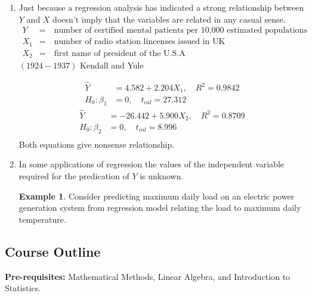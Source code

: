 \documentclass[11pt,a4paper]{article}
\theoremstyle{definition}
\newtheorem{exa}[thm]{Example}
\begin{document}
\begin{enumerate}
\item Just because a regression analysis has indicated a strong relationship between $Y$ and $X$ doesn't imply that the variables are related in any casual sense.
\begin{align*}
Y & = \quad \text{number of certified mental patients per 10,000 estimated populations}\\
X_1 & = \quad \text{number of radio station lincenses issued in UK}\\
X_2 & = \quad \text{first name of president of the U.S.A}
\end{align*}
$(1924-1937) $  Kendall and Yule 

\begin{align*}
\widehat{Y} & = 4.582+2.204X_1, \quad  R^2=0.9842\\
H_0: \beta_1 & =0,\quad  t_{cal}=27.312
\end{align*}
\begin{align*}
\widehat{Y} & = -26.442+5.900X_2,\quad  R^2=0.8709\\
H_0: \beta_2 &=0,\quad  t_{cal}=8.996\\
\end{align*}
Both equations  give nonsense relationship.

\item In some applications of regression the values of the independent variable required for the predication of $Y$ is unknown.\\

\begin{exa}
Consider predicting maximum daily load on an electric power generation system from regression model relating the load to maximum daily temperature.
\end{exa}

\end{enumerate}


\pagebreak

\thispagestyle{empty}


\subsection*{Course Outline}

\noindent\textbf{Pre-requisites:} Mathematical Methods, Linear Algebra, and
Introduction to Statistics.
\end{document}
